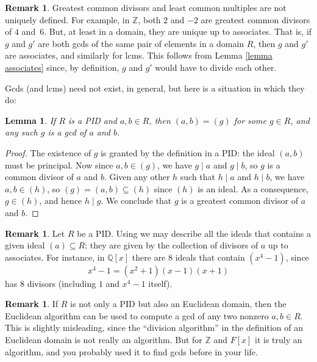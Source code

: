 \documentclass[12pt]{report}
\newtheorem{lemma}[theorem]{Lemma}
\numberwithin{equation}{section}
\numberwithin{theorem}{chapter}
\theoremstyle{definition}
\newtheorem*{basic properties}{Basic Properties}
\newtheorem*{Important Remark}{Important Remark}
\newtheorem{remark}[theorem]{Remark}
\begin{document}
\begin{remark} \label{remark uniqueness of gcds}
  Greatest common divisors and least common multiples are not uniquely defined. For example, in $\mathbb{Z}$, both $2$ and $-2$ are greatest common divisors of $4$ and~$6$.
  But, at least  in a domain, they are unique up to associates. That is, if $g$ and $g'$ are both gcds of the same pair of elements in a domain $R$, then $g$
  and $g'$ are associates, and similarly for lcms. This follows from Lemma \ref{lemma associates} since, by definition, $g$ and $g'$ would have to divide each other.
\end{remark}

Gcds (and lcms) need not exist, in general, but here is a situation in which they do:

\begin{lemma}\label{pid gcds}
If $R$ is a PID and $a,b\in R$, then  $(a,b) = (g)$ for some $g \in R$, and any such $g$ is a gcd of $a$ and $b$.
\end{lemma}
 
 
 \begin{proof}
   The existence of $g$ is granted by the definition in a PID: the ideal $(a,b)$ must be principal.
   Now since $a, b \in (g)$, we have $g \mid a$ and $g\mid b$, so $g$ is a common divisor of $a$ and $b$.
   Given any other $h$ such that $h \mid a$ and $h \mid b$, we have $a,b\in (h)$, so $(g)=(a,b)\subseteq (h)$ since $(h)$ is an ideal.
   As a consequence, $g \in (h)$, and hence $h \mid g$. We conclude that $g$ is a greatest common divisor of $a$ and $b$.
\end{proof}


\begin{remark} 
Let $R$ be a PID.
Using 
we may describe all the ideals that contains a given ideal $(a) \subseteq R$: they are given by the collection of divisors of $a$ up to associates. For instance, in $\mathbb{Q}[x]$ there are $8$ ideals that contain $(x^4-1)$, since 
$$x^4-1 = (x^2+1)(x-1)(x+1)$$ 
has $8$ divisors (including $1$ and $x^4-1$ itself).
\end{remark}


\begin{remark} 
If $R$ is not only a PID but also an Euclidean domain, then the Euclidean algorithm can be used to compute a gcd of any two nonzero $a,b\in R$. This is slightly misleading, since the
``division algorithm'' in the definition of an Euclidean domain is not really an algorithm. But for $\mathbb{Z}$ and $F[x]$ it is truly an algorithm, and you probably used it to find gcds
before in your life. 
\end{remark}
\end{document}
